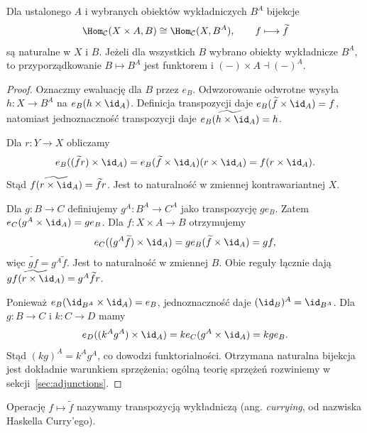 \begin{twierdzenie}\label{cat:thm:exp-naturality}
Dla ustalonego $A$ i wybranych obiektów wykładniczych $B^A$ bijekcje
\[
\Hom_{\mathcal C}(X\times A,B)
\cong\Hom_{\mathcal C}(X,B^A),\qquad
f\longmapsto\widetilde f
\]
są naturalne w $X$ i $B$. Jeżeli dla wszystkich $B$ wybrano obiekty wykładnicze $B^A$, to przyporządkowanie $B\mapsto B^A$ jest funktorem i $(-)\times A\dashv(-)^A$.
\end{twierdzenie}
\begin{proof}
Oznaczmy ewaluację dla $B$ przez $e_B$. Odwzorowanie odwrotne wysyła $h:X\to B^A$ na $e_B(h\times\id_A)$. Definicja transpozycji daje $e_B(\widetilde f\times\id_A)=f$, natomiast jednoznaczność transpozycji daje $\widetilde{e_B(h\times\id_A)}=h$.

Dla $r:Y\to X$ obliczamy
\[
e_B((\widetilde f r)\times\id_A)
=e_B(\widetilde f\times\id_A)(r\times\id_A)
=f(r\times\id_A).
\]
Stąd $\widetilde{f(r\times\id_A)}=\widetilde f r$. Jest to naturalność w zmiennej kontrawariantnej $X$.

Dla $g:B\to C$ definiujemy $g^A:B^A\to C^A$ jako transpozycję $ge_B$. Zatem $e_C(g^A\times\id_A)=ge_B$. Dla $f:X\times A\to B$ otrzymujemy
\[
e_C((g^A\widetilde f)\times\id_A)
=ge_B(\widetilde f\times\id_A)=gf,
\]
więc $\widetilde{gf}=g^A\widetilde f$. Jest to naturalność w zmiennej $B$. Obie reguły łącznie dają
$\widetilde{gf(r\times\id_A)}=g^A\widetilde f r$.

Ponieważ $e_B(\id_{B^A}\times\id_A)=e_B$, jednoznaczność daje $(\id_B)^A=\id_{B^A}$. Dla $g:B\to C$ i $k:C\to D$ mamy
\[
e_D((k^Ag^A)\times\id_A)
=ke_C(g^A\times\id_A)=kge_B.
\]
Stąd $(kg)^A=k^Ag^A$, co dowodzi funktorialności. Otrzymana naturalna bijekcja jest dokładnie warunkiem sprzężenia; ogólną teorię sprzężeń rozwiniemy w sekcji~\ref{sec:adjunctions}.
\end{proof}

Operację $f\mapsto\widetilde f$ nazywamy transpozycją wykładniczą (ang. \emph{currying}, od nazwiska Haskella Curry'ego).

